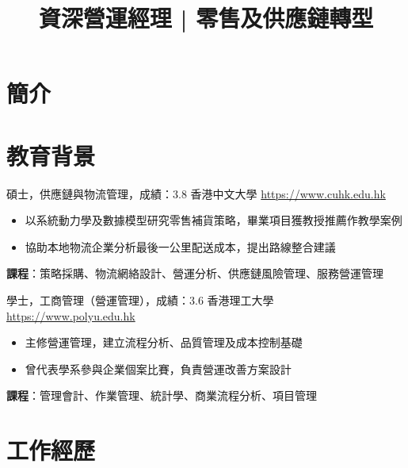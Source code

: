 \documentclass[a4paper, serif, 10pt]{moderncv}
\title{資深營運經理 | 零售及供應鏈轉型}
\begin{document}
\maketitle

\section{簡介}

\section{教育背景}

        {碩士，供應鏈與物流管理，成績：3.8}
        {香港中文大學}
        {\url{https://www.cuhk.edu.hk}}
        {}
        {\begin{itemize}
\item 以系統動力學及數據模型研究零售補貨策略，畢業項目獲教授推薦作教學案例
\item 協助本地物流企業分析最後一公里配送成本，提出路線整合建議
\end{itemize}
\textbf{課程}：策略採購、物流網絡設計、營運分析、供應鏈風險管理、服務營運管理}

        {學士，工商管理（營運管理），成績：3.6}
        {香港理工大學}
        {\url{https://www.polyu.edu.hk}}
        {}
        {\begin{itemize}
\item 主修營運管理，建立流程分析、品質管理及成本控制基礎
\item 曾代表學系參與企業個案比賽，負責營運改善方案設計
\end{itemize}
\textbf{課程}：管理會計、作業管理、統計學、商業流程分析、項目管理}
\section{工作經歷}
\end{document}
